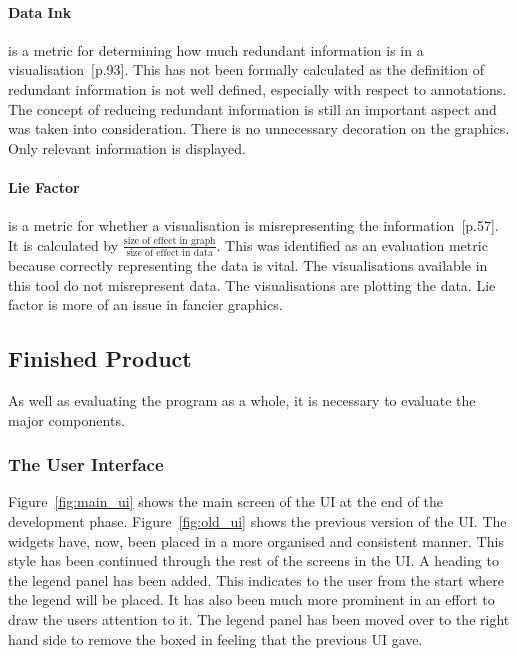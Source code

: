 \paragraph*{Data Ink} is a metric for determining how much redundant information is in a visualisation~\cite{tufte}[p.93].  This has not been formally calculated as the definition of redundant information is not well defined, especially with respect to annotations.  The concept of reducing redundant information is still an important aspect and was taken into consideration.  There is no unnecessary decoration on the graphics.  Only relevant information is displayed.

\paragraph*{Lie Factor} is a metric for whether a visualisation is misrepresenting the information~\cite{tufte}[p.57].  It is calculated by $\frac{\text{size of effect in graph}}{\text{size of effect in data}}$.  This was identified as an evaluation metric because correctly representing the data is vital.  The visualisations available in this tool do not misrepresent data.  The visualisations are plotting the data.  Lie factor is more of an issue in fancier graphics.

\subsection{Finished Product}

As well as evaluating the program as a whole, it is necessary to evaluate the major components.

\subsubsection{The User Interface}

Figure~\ref{fig:main_ui} shows the main screen of the \ac{UI} at the end of the development phase.  Figure~\ref{fig:old_ui} shows the previous version of the \ac{UI}.  The widgets have, now, been placed in a more organised and consistent manner.  This style has been continued through the rest of the screens in the \ac{UI}.  A heading to the legend panel has been added.  This indicates to the user from the start where the legend will be placed.  It has also been much more prominent in an effort to draw the users attention to it.  The legend panel has been moved over to the right hand side to remove the boxed in feeling that the previous \ac{UI} gave.

